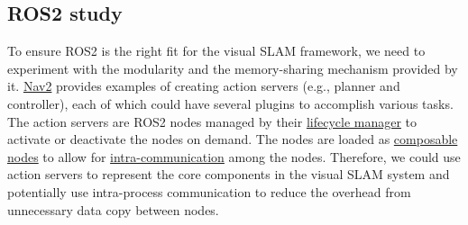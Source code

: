 \subsection{ROS2 study}

To ensure ROS2 is the right fit for the visual SLAM framework, we need to experiment with the modularity and the memory-sharing mechanism provided by it.
\href{https://github.com/ros-planning/navigation2}{Nav2} provides examples of creating action servers (e.g., planner and controller), each of which could have several plugins to accomplish various tasks.
The action servers are ROS2 nodes managed by their \href{https://github.com/ros2/demos/blob/humble/lifecycle/README.rst}{lifecycle manager} to activate or deactivate the nodes on demand.
The nodes are loaded as \href{https://docs.ros.org/en/humble/How-To-Guides/Launching-composable-nodes.html}{composable nodes} to allow for \href{https://docs.ros.org/en/humble/Tutorials/Demos/Intra-Process-Communication.html}{intra-communication} among the nodes.
Therefore, we could use action servers to represent the core components in the visual SLAM system and potentially use intra-process communication to reduce the overhead from unnecessary data copy between nodes.